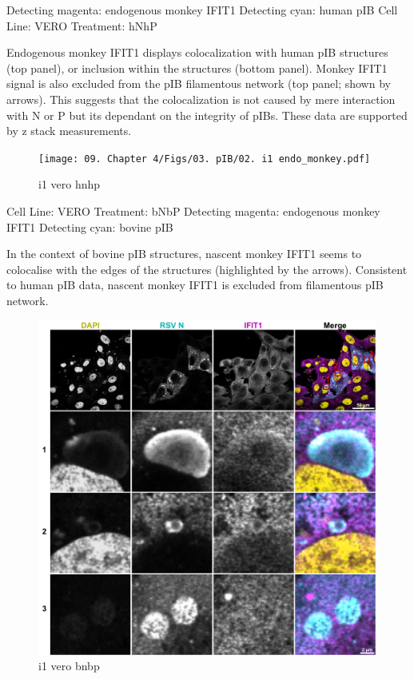 Detecting magenta: endogenous monkey IFIT1 \newline
Detecting cyan: human pIB \newline
Cell Line: VERO \newline
Treatment: hNhP \newline

Endogenous monkey IFIT1 displays colocalization with human pIB structures (top panel), or inclusion within the structures (bottom panel). Monkey IFIT1 signal is also excluded from the pIB filamentous network (top panel; shown by arrows). This suggests that the colocalization is not caused by mere interaction with N or P but its dependant on the integrity of pIBs. These data are supported by z stack measurements.  

\begin{figure}
    \centering
    \texttt{[image: 09. Chapter 4/Figs/03. pIB/02. i1 endo\_monkey.pdf]}
    \caption[i1 vero hnhp]{i1 vero hnhp}
    \label{fig:i1 vero hnhp}
\end{figure}


Cell Line: VERO \newline
Treatment: bNbP \newline
Detecting magenta: endogenous monkey IFIT1 \newline
Detecting cyan: bovine pIB \newline

In the context of bovine pIB structures, nascent monkey IFIT1 seems to colocalise with the edges of the structures (highlighted by the arrows). Consistent to human pIB data, nascent monkey IFIT1 is excluded from filamentous pIB network.


\begin{figure}
    \centering
    \includegraphics[width=1\linewidth]{09. Chapter 4/Figs/03. pIB/03. i1 endo_monkey_bovine-pIB.pdf}
    \caption[i1 vero bnbp]{i1 vero bnbp}
    \label{fig:i1 vero bnbp}
\end{figure}

